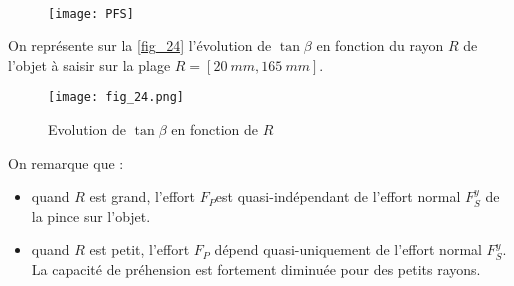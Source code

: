 

\ifprof
\begin{corrige}~\\
\begin{figure}[H]
\centering
{\texttt{[image: PFS]}}
\end{figure}

\end{corrige}
\else
\fi

\ifprof
\else
On représente sur la \autoref{fig_24}  l'évolution de $\tan \beta$ en fonction du rayon $R$ de l'objet à saisir sur la plage $R =[\SI{20}{mm}, \SI{165}{mm}]$.

\begin{figure}[H]
\centering
\texttt{[image: fig\_24.png]}
\caption{Evolution de $\tan \beta$ en fonction de $R$ \label{fig_24}}
\end{figure}
\fi


\ifprof
\begin{corrige}
On remarque que :
\begin{itemize}
\item quand $R$ est grand, l’effort $F_P$est quasi-indépendant de l’effort normal $F_S^y$ de la pince sur l’objet. 
\item quand $R$ est petit, l’effort $F_P$ dépend quasi-uniquement de l’effort normal $F_S^y$. La capacité de préhension est fortement diminuée pour des petits rayons.
\end{itemize}
\end{corrige}
\else
\fi

